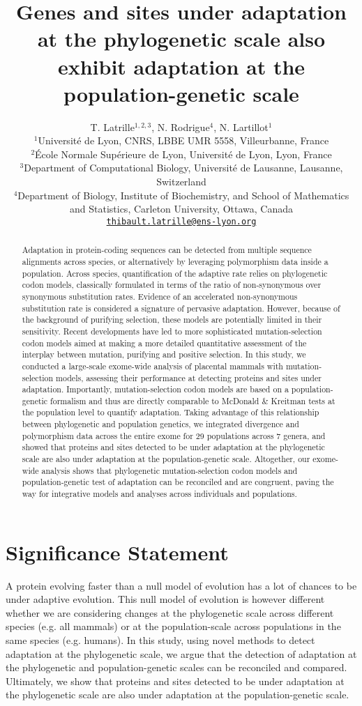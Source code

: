 \documentclass{article}
\title{Genes and sites under adaptation at the phylogenetic scale also exhibit adaptation at the population-genetic scale}
\author{
    \large
    T. {Latrille}$^{1,2,3}$, N. {Rodrigue}$^{4}$, N. {Lartillot}$^{1}$\\
    \normalsize
    $^{1}$Université de Lyon, CNRS, LBBE UMR 5558, Villeurbanne, France\\
    $^{2}$École Normale Supérieure de Lyon, Université de Lyon, Lyon, France\\
    $^{3}$Department of Computational Biology, Université de Lausanne, Lausanne, Switzerland\\
    $^{4}$Department of Biology, Institute of Biochemistry, and School of Mathematics and Statistics, Carleton University, Ottawa, Canada \\
    \texttt{\href{mailto:thibault.latrille@ens-lyon.org}{thibault.latrille@ens-lyon.org}} \\
}
\begin{document}
    \maketitle

    \begin{abstract}
        Adaptation in protein-coding sequences can be detected from multiple sequence alignments across species, or alternatively by leveraging polymorphism data inside a population.
        Across species, quantification of the adaptive rate relies on phylogenetic codon models, classically formulated in terms of the ratio of non-synonymous over synonymous substitution rates.
        Evidence of an accelerated non-synonymous substitution rate is considered a signature of pervasive adaptation.
        However, because of the background of purifying selection, these models are potentially limited in their sensitivity.
        Recent developments have led to more sophisticated mutation-selection codon models aimed at making a more detailed quantitative assessment of the interplay between mutation, purifying and positive selection.
        In this study, we conducted a large-scale exome-wide analysis of placental mammals with mutation-selection models, assessing their performance at detecting proteins and sites under adaptation.
        Importantly, mutation-selection codon models are based on a population-genetic formalism and thus are directly comparable to McDonald \& Kreitman tests at the population level to quantify adaptation.
        Taking advantage of this relationship between phylogenetic and population genetics, we integrated divergence and polymorphism data across the entire exome for 29 populations across 7 genera, and showed that proteins and sites detected to be under adaptation at the phylogenetic scale are also under adaptation at the population-genetic scale.
        Altogether, our exome-wide analysis shows that phylogenetic mutation-selection codon models and population-genetic test of adaptation can be reconciled and are congruent, paving the way for integrative models and analyses across individuals and populations.
    \end{abstract}


    \section*{Significance Statement}
    A protein evolving faster than a null model of evolution has a lot of chances to be under adaptive evolution. This null model of evolution is however different whether we are considering changes at the phylogenetic scale across different species (e.g. all mammals) or at the population-scale across populations in the same species (e.g. humans). In this study, using novel methods to detect adaptation at the phylogenetic scale, we argue that the detection of adaptation at the phylogenetic and population-genetic scales can be reconciled and compared. Ultimately, we show that proteins and sites detected to be under adaptation at the phylogenetic scale are also under adaptation at the population-genetic scale.
\end{document}
